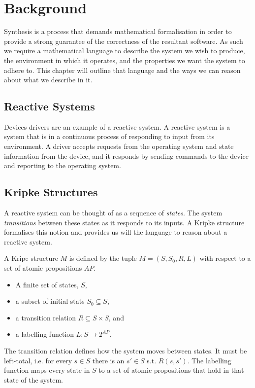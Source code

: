 \chapter{Background}

Synthesis is a process that demands mathematical formalisation in order to
provide a strong guarantee of the correctness of the resultant software. As
such we require a mathematical language to describe the system we wish to
produce, the environment in which it operates, and the properties we want the
system to adhere to. This chapter will outline that language and the ways we
can reason about what we describe in it.

\section{Reactive Systems}

Devices drivers are an example of a reactive system. A reactive system is a
system that is in a continuous process of responding to input from its
environment. A driver accepts requests from the operating system and state
information from the device, and it responds by sending commands to the device
and reporting to the operating system.

\section{Kripke Structures}

A reactive system can be thought of as a sequence of \emph{states}. The system
\emph{transitions} between these states as it responds to its inputs. A Kripke
structure~\cite{Kripke63} formalises this notion and provides us will the
language to reason about a reactive system.

A Kripe structure $M$ is defined by the tuple $M = (S, S_0, R, L)$ with respect
to a set of atomic propositions $AP$.

\begin{itemize}
    \item A finite set of states, $S$,
    \item a subset of initial stats $S_0 \subseteq S$,
    \item a transition relation $R \subseteq S \times S$, and
    \item a labelling function $L : S \to 2^{AP}$.
\end{itemize}

The transition relation defines how the system moves between states. It must be
left-total, i.e. for every $s \in S$ there is an $s' \in S$ s.t. $R(s, s')$.
The labelling function maps every state in $S$ to a set of atomic propositions
that hold in that state of the system.

